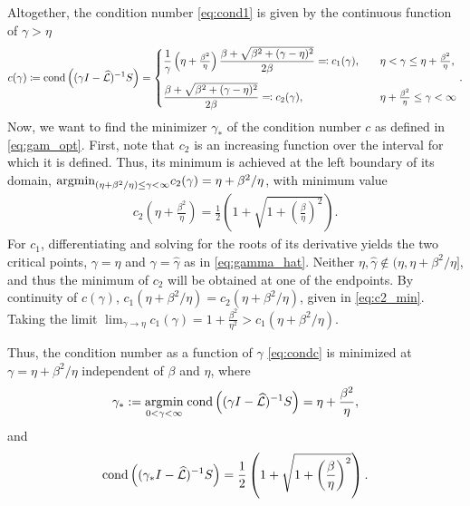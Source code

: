 \documentclass[a4paper,10pt]{article}
\begin{document}
Altogether, the condition number \eqref{eq:cond1} is given by the continuous function of $\gamma>\eta$
\begin{align}
\label{eq:condc}
c(\gamma) 
\coloneqq
\textnormal{cond}\left((\gamma I- \widehat{\mathcal{L}})^{-1}S\right)  
=
\begin{cases}
\displaystyle
\frac{1}{\gamma} \left(\eta + \tfrac{\beta^2}{\eta} \right) \frac{\beta + \sqrt{\beta^2 + (\gamma-\eta)^2}}{2\beta}
\eqqcolon c_1(\gamma), 
\quad & \eta < \gamma \leq \eta + \tfrac{\beta^2}{\eta},
\\[3ex]
\displaystyle
\frac{\beta + \sqrt{\beta^2 + (\gamma-\eta)^2}}{2\beta}
\eqqcolon c_2(\gamma), 
\quad &\eta + \tfrac{\beta^2}{\eta} \leq \gamma < \infty 
\end{cases}.
\end{align}
Now, we want to find the minimizer $\gamma_*$ of the condition number $c$
as defined in \eqref{eq:gam_opt}.
First, note that $c_2$ is an increasing function over the interval for
which it is defined. Thus, its minimum is achieved at the left boundary
of its domain, $\textnormal{argmin}_{(\eta + \beta^2/\eta) \leq \gamma
< \infty} c_2(\gamma) = \eta + \beta^2/\eta$, with minimum value
%
\begin{align} 
\label{eq:c2_min}
c_2\left(\eta + \frac{\beta^2}{\eta} \right) = \frac{1}{2} \left( 1 + \sqrt{1 + \left( \frac{\beta}{\eta} \right)^2} \right).
\end{align}
%
For $c_1$, differentiating and solving for the roots of its derivative
yields the two critical points, $\gamma = \eta$ and $\gamma = \hat{\gamma}$
as in \eqref{eq:gamma_hat}. Neither $\eta,\hat{\gamma}\not\in(\eta, \eta + \beta^2/\eta]$,
and thus the minimum of $c_2$ will be obtained at one of the endpoints. 
By continuity of $c(\gamma)$, $c_1(\eta + \beta^2/\eta) = c_2(\eta + \beta^2/\eta)$,
given in \eqref{eq:c2_min}. Taking the limit $\lim_{\gamma\to\eta} c_1(\gamma)
= 1+\tfrac{\beta^2}{\eta^2} > c_1(\eta + \beta^2/\eta)$.

Thus, the condition number as a function of $\gamma$ \eqref{eq:condc} is
minimized at $\gamma = \eta + \beta^2 / \eta$ independent of $\beta$ and $\eta$,
where
%
\begin{align}
\gamma_* 
:= 
\underset{0 < \gamma < \infty}{\textnormal{argmin}} \; \textnormal{cond} \left((\gamma I- \widehat{\mathcal{L}})^{-1}S\right) 
= 
\eta + \frac{\beta^2}{\eta},
\end{align}
and
\begin{align} \label{eq:cond_min}
\textnormal{cond}\left((\gamma_* I- \widehat{\mathcal{L}})^{-1}S\right)
=
\frac{1}{2} \left( 1 + \sqrt{1 + \left( \frac{\beta}{\eta} \right)^2} \right).
\end{align}
\end{document}
